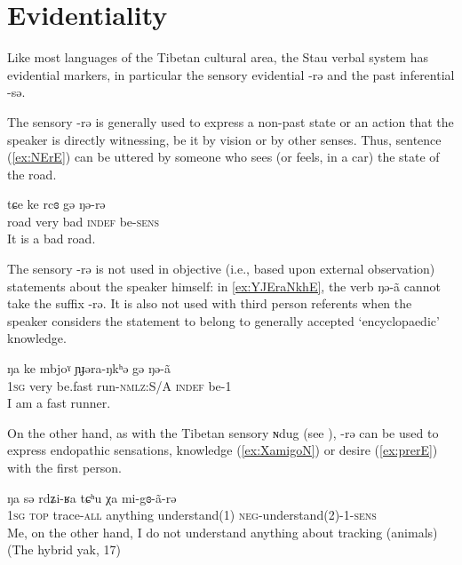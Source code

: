 \documentclass[oneside,a4paper,11pt]{article}
\newcommand{\ipa}[1]{{\phon #1}} %
\begin{document}
\section{Evidentiality}

Like most languages of the Tibetan cultural area, the Stau verbal system has evidential markers, in particular the sensory evidential \ipa{-rə} and the past inferential \ipa{-sə}.

The sensory  \ipa{-rə} is generally used to express a non-past state or an action that the speaker is directly witnessing, be it by vision or by other senses. Thus, sentence (\ref{ex:NErE}) can be uttered by someone who sees (or feels, in a car) the state of the road.

 \begin{exe}
\ex \label{ex:NErE}
\gll
\ipa{tɕe} 	\ipa{ke} 	\ipa{rcɞ} 	\ipa{gə} 	\ipa{ŋə-rə}  \\
road very bad \textsc{indef} be-\textsc{sens} \\
\glt It is a bad road.
 \end{exe}
 
The sensory \ipa{-rə} is not used in objective (i.e., based upon external observation) statements about the speaker himself: in \ref{ex:YJEraNkhE},  the verb \ipa{ŋə-ã} cannot take  the suffix \ipa{-rə}. It is also not used with third person referents when the speaker  considers the statement  to belong to generally accepted `encyclopaedic' knowledge. 

  \begin{exe}
\ex \label{ex:YJEraNkhE}
\gll
  \ipa{ŋa} 	\ipa{ke} \ipa{mbjoˠ} 	\ipa{ɲɟəra-ŋkʰə} 	\ipa{gə} 	\ipa{ŋə-ã} \\
\textsc{1sg} very be.fast run-\textsc{nmlz}:S/A \textsc{indef} be-1 \\
\glt I am a fast runner.
  \end{exe}
  
 
  
On the other hand, as with the Tibetan sensory \ipa{ɴdug} (see \citealt{tournadre14evidentiality}), \ipa{-rə}  can be used to express endopathic sensations, knowledge (\ref{ex:XamigoN}) or desire (\ref{ex:prerE}) with the first person.

\begin{exe}
\ex \label{ex:XamigoN}
\gll
\ipa{ŋa} 	\ipa{sə} 	\ipa{rdʑi-ʁa} 	\ipa{tɕʰu} 	\ipa{χa} 	\ipa{mi-gɞ-ã-rə} 	\\
\textsc{1sg} \textsc{top} trace-\textsc{all} anything understand(1) \textsc{neg}-understand(2)-1-\textsc{sens} \\
\glt Me, on the other hand, I do not understand anything about tracking (animals) (The hybrid yak, 17)
\end{exe}
\end{document}
